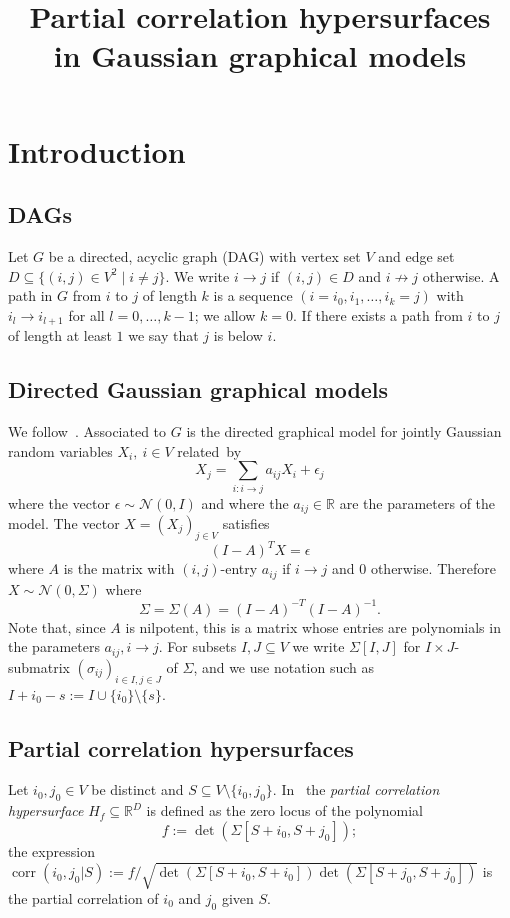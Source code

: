 \documentclass[ALCO,ThmDefs,Unicode]{cedram}
\title[Partial correlation hypersurfaces]{Partial correlation hypersurfaces\\ in Gaussian graphical models}
\author[\initial{J.} Draisma]{\firstname{Jan} \lastname{Draisma}}
\DeclareMathOperator{\corr}{corr}
\newcommand{\RR}{\mathbb{R}}
\begin{document}
\maketitle

\section{Introduction} \label{sec:Introduction}

\subsection*{DAGs}

Let $G$ be a directed, acyclic graph (DAG) with vertex set $V$ and edge set $D \subseteq \{(i,j) \in V^2 \mid i \neq j\}$. We write $i \to j$ if $(i,j) \in D$ and $i \not \to j$ otherwise. A path in $G$ from $i$ to $j$ of length $k$ is a sequence $(i=i_0,i_1,\ldots,i_k=j)$ with $i_{l} \to i_{l+1}$ for all $l=0,\ldots,k-1$; we allow $k=0$. If there exists a path from $i$ to $j$ of length at least $1$ we say that $j$ is below $i$.

\subsection*{Directed Gaussian graphical models}

We follow~\cite[p.~87]{Drton09}. Associated to $G$ is the directed graphical model for jointly Gaussian random variables $X_i,\ i \in V$ related~by
\[
X_j=\sum_{i: i \to j} a_{ij} X_i + \epsilon_j
\]
where the vector $\epsilon \sim \mathcal{N}(0,I)$ and where the $a_{ij} \in \RR$ are the parameters of the model. The vector $X=(X_j)_{j \in V}$ satisfies
\[
(I-A)^T X=\epsilon
\]
where $A$ is the matrix with $(i,j)$-entry $a_{ij}$ if $i
\to j$ and $0$ otherwise. Therefore $X\sim \mathcal{N}(0,\Sigma)$ where
\[
\Sigma=\Sigma(A)=(I-A)^{-T} (I-A)^{-1}.
\]
Note that, since $A$ is nilpotent, this is a matrix whose entries are polynomials in the parameters $a_{ij}, i \to j$. For subsets $I,J \subseteq V$ we write $\Sigma[I,J]$ for $I \times J$-submatrix $(\sigma_{ij})_{i \in I,j \in J}$ of $\Sigma$, and we use notation such as $I+i_0-s:=I \cup \{i_0\} \setminus \{s\}$.


\subsection*{Partial correlation hypersurfaces}

Let $i_0,j_0 \in V$ be distinct and $S \subseteq V \setminus \{i_0,j_0\}$. In~\cite{Uhler14} the \emph{partial correlation hypersurface} $H_f \subseteq \RR^D$ is defined as the zero locus of the polynomial
\[
f:=\det(\Sigma[S+i_0,S+j_0]);
\]
the expression $\corr(i_0,j_0|S):=f/\sqrt{\det(\Sigma[S+i_0,S+i_0])
\det(\Sigma[S+j_0,S+j_0])}$ is the partial correlation of $i_0$ and $j_0$ given $S$.
\end{document}
